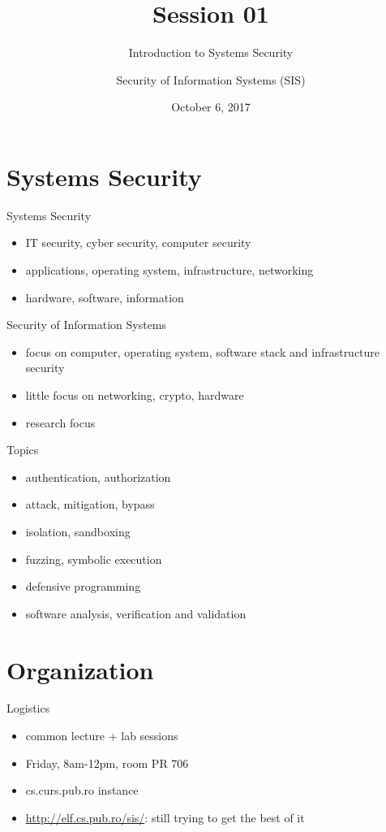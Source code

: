 \documentclass{curs}
\title[Session 01]{Session 01}
\subtitle{Introduction to Systems Security}
\author{Security of Information Systems (SIS)}
\date{October 6, 2017}
\begin{document}
\frame{\titlepage}


\section{Systems Security}

\begin{frame}{Systems Security}
  \begin{itemize}
    \item IT security, cyber security, computer security
    \item applications, operating system, infrastructure, networking
    \item hardware, software, information
  \end{itemize}
\end{frame}

\begin{frame}{Security of Information Systems}
  \begin{itemize}
    \item focus on computer, operating system, software stack and infrastructure security
    \item little focus on networking, crypto, hardware
    \item research focus
  \end{itemize}
\end{frame}

\begin{frame}{Topics}
  \begin{itemize}
    \item authentication, authorization
    \item attack, mitigation, bypass
    \item isolation, sandboxing
    \item fuzzing, symbolic execution
    \item defensive programming
    \item software analysis, verification and validation
  \end{itemize}
\end{frame}


\section{Organization}

\begin{frame}{Logistics}
  \begin{itemize}
    \item common lecture + lab sessions
    \item Friday, 8am-12pm, room PR 706
    \item cs.curs.pub.ro instance
    \item \url{http://elf.cs.pub.ro/sis/}: still trying to get the best of it
  \end{itemize}
\end{frame}
\end{document}
